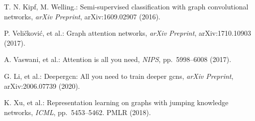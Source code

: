 \documentclass[a4j,twocolumn]{jsarticle}
\begin{document}

\renewcommand{\bibname}{参考文献}
\begin{thebibliography}{1}
\vspace{-2mm}

T. N. Kipf, M. Welling.:
Semi-supervised classification with graph convolutional networks,
{\it arXiv Preprint}, arXiv:1609.02907 (2016).
\vspace{-0.3mm}

P. Veli{\v{c}}kovi{\'c}, et al.:
Graph attention networks,
{\it arXiv Preprint}, arXiv:1710.10903 (2017).
\vspace{-0.3mm}

A. Vaswani, et al.:
Attention is all you need,
{\it NIPS}, pp.~5998--6008 (2017).
\vspace{-0.3mm}

G. Li, et al.:
Deepergcn: All you need to train deeper gcns,
{\it arXiv Preprint}, arXiv:2006.07739 (2020).
\vspace{-0.3mm}

K. Xu, et al.:
Representation learning on graphs with jumping knowledge networks,
{\it ICML}, pp.~5453--5462. PMLR (2018).
\vspace{-0.3mm}

\end{thebibliography}
\end{document}
